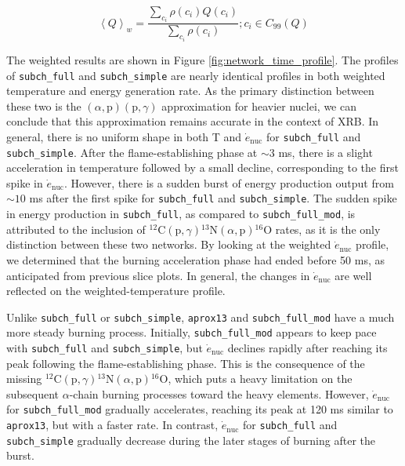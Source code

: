 \documentclass[preprint,times,tighten]{aastex631}
\begin{document}
\begin{equation}\label{Eq:weighted_equation}
    \left<Q\right>_w = \frac{\sum\limits_{c_i}^{} \rho(c_i) Q(c_i)}{\sum\limits_{c_i} \rho(c_i)}; c_i \in C_{99}(Q)
\end{equation}

The weighted results are shown in Figure \ref{fig:network_time_profile}. The profiles of {\tt subch\_full} and {\tt subch\_simple} are nearly identical profiles in both weighted temperature and energy generation rate. As the primary distinction between these two is the $(\alpha, \mbox{p})(\mbox{p}, \gamma)$ approximation for heavier nuclei, we can conclude that this approximation remains accurate in the context of XRB. In general, there is no uniform shape in both T and $\dot{e}_{\textrm{nuc}}$ for {\tt subch\_full} and {\tt subch\_simple}. After the flame-establishing phase at $\sim 3$ ms, there is a slight acceleration in temperature followed by a small decline, corresponding to the first spike in $\dot{e}_{\textrm{nuc}}$. However, there is a sudden burst of energy production output from $\sim 10$ ms after the first spike for {\tt subch\_full} and {\tt subch\_simple}. The sudden spike in energy production in {\tt subch\_full}, as compared to {\tt subch\_full\_mod}, is attributed to the inclusion of ${}^{12}\mbox{C}(\mbox{p}, \gamma) {}^{13}\mbox{N}(\alpha, \mbox{p}){}^{16}\mbox{O}$ rates, as it is the only distinction between these two networks. By looking at the weighted $\dot{e}_{\textrm{nuc}}$ profile, we determined that the burning acceleration phase had ended before 50 ms, as anticipated from previous slice plots. In general, the changes in $\dot{e}_{\textrm{nuc}}$ are well reflected on the weighted-temperature profile. 

Unlike {\tt subch\_full} or {\tt subch\_simple}, {\tt aprox13} and {\tt subch\_full\_mod} have a much more steady burning process. Initially, {\tt subch\_full\_mod} appears to keep pace with {\tt subch\_full} and {\tt subch\_simple}, but $\dot{e}_{\textrm{nuc}}$ declines rapidly after reaching its peak following the flame-establishing phase. This is the consequence of the missing ${}^{12}\mbox{C}(\mbox{p}, \gamma) {}^{13}\mbox{N}(\alpha, \mbox{p}){}^{16}\mbox{O}$, which puts a heavy limitation on the subsequent $\alpha$-chain burning processes toward the heavy elements. However, $\dot{e}_{\textrm{nuc}}$ for {\tt subch\_full\_mod} gradually accelerates, reaching its peak at 120 ms similar to {\tt aprox13}, but with a faster rate. In contrast, $\dot{e}_{\textrm{nuc}}$ for {\tt subch\_full} and {\tt subch\_simple} gradually decrease during the later stages of burning after the burst.
\end{document}
